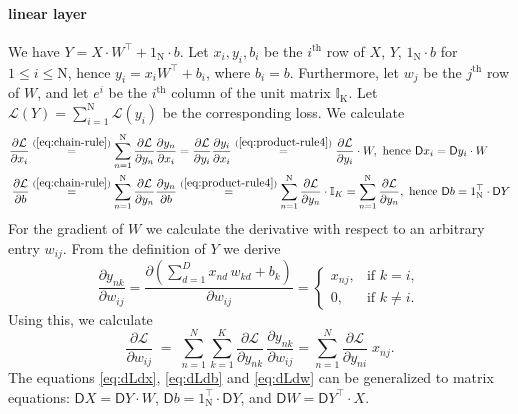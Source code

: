 \documentclass[twoside,11pt]{article}
\newcommand{\const}[1]{\ensuremath{\mathrm{#1}}} %
\newcommand{\Gradient}{\textsf{D}}
\newcommand{\Derivative}[2]{\ensuremath{\frac{\partial #1}{\partial #2}}}
\begin{document}
\paragraph{linear layer}
We have $Y = X \cdot W^\top + 1_\const{N} \cdot b$. Let $x_i, y_i, b_i$ be the $i^\text{th}$ row of $X$, $Y$, $1_\const{N} \cdot b$ for $1 \leq i \leq \const{N}$, hence $y_i = x_i W^\top + b_i$, where $b_i = b$. Furthermore, let $w_j$ be the $j^\text{th}$ row of $W$, and let $e^i$ be the $i^\text{th}$ column of the unit matrix $\mathbb{I}_\const{K}$. Let $\mathcal{L}(Y) = \sum_{i=1}^\const{N} \mathcal{L}(y_i)$ be the corresponding loss. We calculate
\begin{align}
  \label{eq:dLdx}
  \Derivative{\mathcal{L}}{x_i} 
  &\overset{(\ref{eq:chain-rule})}{=} \sum_{n=1}^\const{N} \Derivative{\mathcal{L}}{y_n} \Derivative{y_n}{x_i}
  = \Derivative{\mathcal{L}}{y_i} \Derivative{y_i}{x_i}
  \overset{(\ref{eq:product-rule4})}{=} \Derivative{\mathcal{L}}{y_i} \cdot W,
  \text{ hence } \Gradient{x_i} = \Gradient{y_i} \cdot W
  \\
  \label{eq:dLdb}
  \Derivative{\mathcal{L}}{b} 
  &\overset{(\ref{eq:chain-rule})}{=} \sum_{n=1}^\const{N} \Derivative{\mathcal{L}}{y_n} \Derivative{y_n}{b}
  \overset{(\ref{eq:product-rule4})}{=} \sum_{n=1}^\const{N} \Derivative{\mathcal{L}}{y_n} \cdot \mathbb{I}_K
  = \sum_{n=1}^\const{N} \Derivative{\mathcal{L}}{y_n}, 
  \text{ hence } \Gradient{b} = 1_\const{N}^\top \cdot \Gradient{Y}
\end{align}
For the gradient of $W$ we calculate the derivative with respect to an arbitrary entry \(w_{i j}\).
From the definition of $Y$ we derive
\[
\frac{\partial y_{n k}}{\partial w_{i j}}
=
\frac{\partial (\sum_{d=1}^{D} x_{n d}\,w_{k d}+b_k)}{\partial w_{i j}}
=
\begin{cases}
x_{n j}, & \text{if } k=i,\\[4pt]
0,       & \text{if } k\neq i.
\end{cases}
\]
Using this, we calculate
\begin{equation}
  \label{eq:dLdw}
\frac{\partial\mathcal{L}}{\partial w_{i j}}
\;=\;
\sum_{n=1}^{N}\sum_{k=1}^{K}
\frac{\partial\mathcal{L}}{\partial y_{n k}}\,
\frac{\partial y_{n k}}{\partial w_{i j}}
= \sum_{n=1}^{N} \frac{\partial\mathcal{L}}{\partial y_{n i}} \; x_{n j}.
\end{equation}
The equations \ref{eq:dLdx}, \ref{eq:dLdb} and \ref{eq:dLdw} can be generalized to matrix equations: $\Gradient{X} = \Gradient{Y} \cdot W$, $\Gradient{b} = 1_\const{N}^\top \cdot \Gradient{Y}$, and $\Gradient{W} = \Gradient Y^\top \cdot X$.
\end{document}
